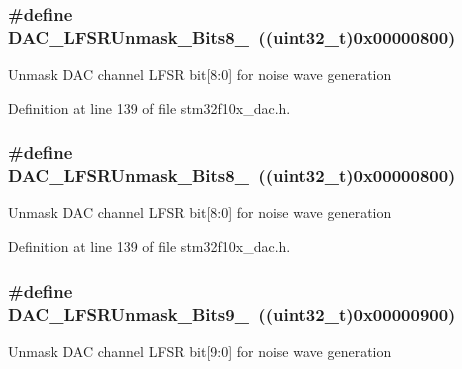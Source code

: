 \subsubsection[{\texorpdfstring{D\+A\+C\+\_\+\+L\+F\+S\+R\+Unmask\+\_\+\+Bits8\+\_\+0}{DAC_LFSRUnmask_Bits8_0}}]{\setlength{\rightskip}{0pt plus 5cm}\#define D\+A\+C\+\_\+\+L\+F\+S\+R\+Unmask\+\_\+\+Bits8\+\_~(({\bf uint32\+\_\+t})0x00000800)}\hypertarget{group___d_a_c__lfsrunmask__triangleamplitude_ga4f56965841d9d91ca5b6de43ee589598}{}\label{group___d_a_c__lfsrunmask__triangleamplitude_ga4f56965841d9d91ca5b6de43ee589598}
Unmask D\+AC channel L\+F\+SR bit\mbox{[}8\+:0\mbox{]} for noise wave generation 

Definition at line 139 of file stm32f10x\+\_\+dac.\+h.

\subsubsection[{\texorpdfstring{D\+A\+C\+\_\+\+L\+F\+S\+R\+Unmask\+\_\+\+Bits8\+\_\+0}{DAC_LFSRUnmask_Bits8_0}}]{\setlength{\rightskip}{0pt plus 5cm}\#define D\+A\+C\+\_\+\+L\+F\+S\+R\+Unmask\+\_\+\+Bits8\+\_~(({\bf uint32\+\_\+t})0x00000800)}\hypertarget{group___d_a_c__lfsrunmask__triangleamplitude_ga4f56965841d9d91ca5b6de43ee589598}{}\label{group___d_a_c__lfsrunmask__triangleamplitude_ga4f56965841d9d91ca5b6de43ee589598}
Unmask D\+AC channel L\+F\+SR bit\mbox{[}8\+:0\mbox{]} for noise wave generation 

Definition at line 139 of file stm32f10x\+\_\+dac.\+h.

\subsubsection[{\texorpdfstring{D\+A\+C\+\_\+\+L\+F\+S\+R\+Unmask\+\_\+\+Bits9\+\_\+0}{DAC_LFSRUnmask_Bits9_0}}]{\setlength{\rightskip}{0pt plus 5cm}\#define D\+A\+C\+\_\+\+L\+F\+S\+R\+Unmask\+\_\+\+Bits9\+\_~(({\bf uint32\+\_\+t})0x00000900)}\hypertarget{group___d_a_c__lfsrunmask__triangleamplitude_gaf7f4540d9ec6efe074e1e4485f9a347a}{}\label{group___d_a_c__lfsrunmask__triangleamplitude_gaf7f4540d9ec6efe074e1e4485f9a347a}
Unmask D\+AC channel L\+F\+SR bit\mbox{[}9\+:0\mbox{]} for noise wave generation 

